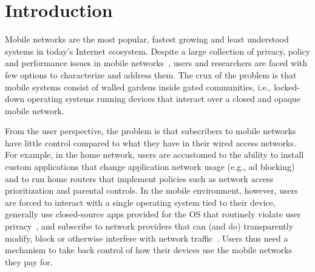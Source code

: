 \section{Introduction}
\label{sec:intro}


Mobile networks are the most popular, fastest growing and least
understood systems in today's Internet ecosystem. Despite a large
collection of privacy, policy and performance issues in mobile
networks~\cite{enck:taintdroid,hornyack:appfence,speedtest,eprof}, users and researchers are faced with few options to
characterize and address them. 
The crux of the problem is 
that mobile systems consist of walled gardens inside gated 
communities, i.e., locked-down operating systems running 
devices that interact over a closed and opaque mobile network. 

%
From the user perspective, the problem is that subscribers to
  mobile networks have little control compared to what they have in
  their wired access networks.
For example, in the home network, users are accustomed to the ability
to install custom applications that change application network usage
(e.g., ad blocking) and to run home routers that implement policies
such as network access prioritization and parental controls. In the
mobile environment, however, users are forced to interact with a
single operating system tied to their device, generally use
closed-source apps provided for the OS that routinely violate user
privacy~\cite{hornyack:appfence}, and subscribe to network providers
that can (and do) transparently modify, block or otherwise interfere
with network traffic~\cite{wang:middleboxes}.  Users thus need a
mechanism to take back control of how their devices use the mobile
networks they pay for.

